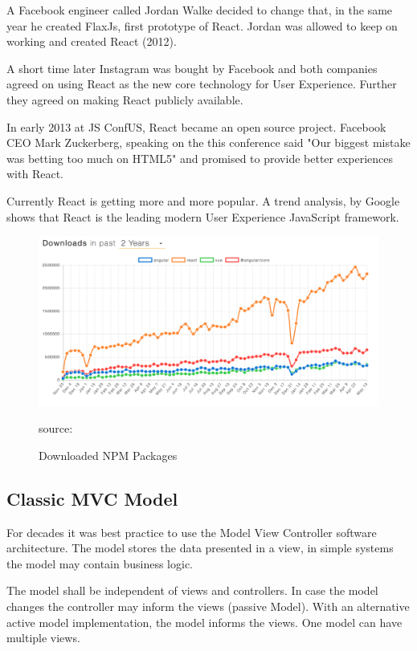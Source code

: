 A Facebook engineer called Jordan Walke decided to change that, in the same year he created FlaxJs, first prototype of React. Jordan was allowed to keep on working and created React (2012). 

A short time later Instagram was bought by Facebook and both companies agreed on using React as the new core technology for User Experience. Further they agreed on making React publicly available. 

In early 2013 at JS ConfUS, React became an open source project. Facebook CEO Mark Zuckerberg, speaking on the this conference said  "Our biggest mistake was betting too much on HTML5" and promised to provide better experiences with React.

Currently React is getting more and more popular. A trend analysis, by Google shows that React is the leading modern User Experience JavaScript framework.

\begin{figure}[H]
	\centering
	\includegraphics[scale=0.4]{bilder/grundlagen/ReactDownloads.png}
	\caption{Downloaded NPM Packages} source:\cite{NPM}
	\label{fig:JS}
\end{figure}


\subsection{Classic MVC Model}
For decades it was best practice to use the Model View Controller software architecture. The model stores the data presented in a view, in simple systems the model may contain business logic.

The model shall be independent of views and controllers. In case the model changes the controller may inform the views (passive Model). With an alternative active model implementation, the model informs the views. One model can have multiple views.
 
